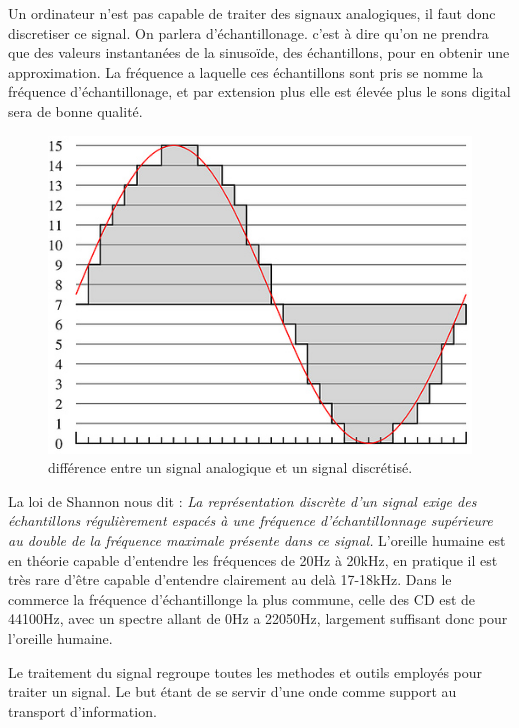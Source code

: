 \documentclass[12pt]{article}
\begin{document}
Un ordinateur n'est pas capable de traiter des signaux analogiques, il faut donc discretiser ce signal. On parlera d'échantillonage. c'est à dire qu'on ne prendra que des valeurs instantanées de la sinusoïde, des échantillons, pour en obtenir une approximation. La fréquence a laquelle ces échantillons sont pris se nomme la fréquence d'échantillonage, et par extension plus elle est élevée plus le sons digital sera de bonne qualité. 
\begin{figure}[H]
\begin{center}
\caption{différence entre un signal analogique et un signal discrétisé.}
\label{fig:analogDigit}
\includegraphics[scale=0.5]{analogique-digital.jpg}
\end{center}
\end{figure}
La loi de Shannon nous dit : \emph{\og La représentation discrète d'un signal exige des échantillons régulièrement espacés à une fréquence d'échantillonnage supérieure au double de la fréquence maximale présente dans ce signal. \fg{} }
L'oreille humaine est en théorie capable d'entendre les fréquences de 20Hz à 20kHz, en pratique il est très rare d'être capable d'entendre clairement au delà 17-18kHz.
Dans le commerce la fréquence d'échantillonge la plus commune, celle des CD est de 44100Hz, avec un spectre allant de 0Hz a 22050Hz, largement suffisant donc pour l'oreille humaine.

Le traitement du signal regroupe toutes les methodes et outils employés pour traiter un signal.
Le but étant de se servir d'une onde comme support au transport d'information. 
\end{document}
